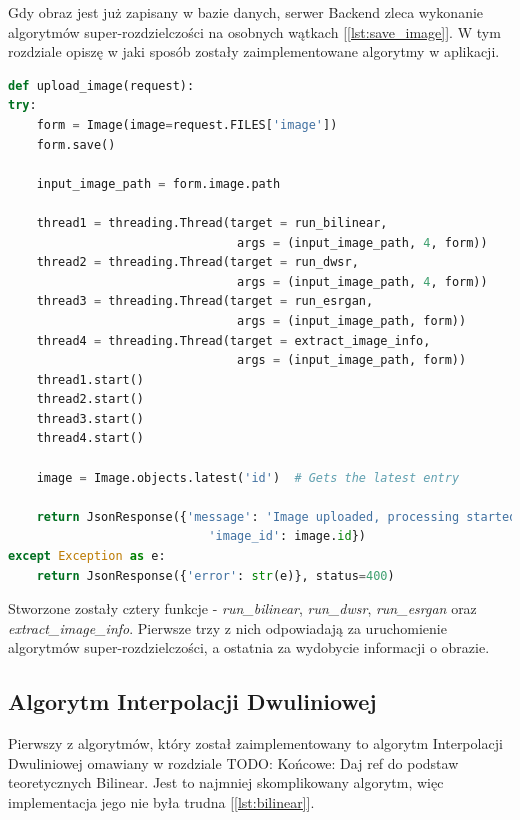 Gdy obraz jest już zapisany w bazie danych, serwer Backend zleca wykonanie algorytmów super-rozdzielczości na osobnych wątkach [\ref{lst:save_image}]. W tym rozdziale opiszę w jaki sposób zostały zaimplementowane algorytmy w aplikacji.

\begin{lstlisting}[language=Python, caption=Obsługa zapisu i przetwarzania obrazów., label={lst:save_image}]
def upload_image(request):
try:
    form = Image(image=request.FILES['image'])
    form.save()

    input_image_path = form.image.path
    
    thread1 = threading.Thread(target = run_bilinear, 
                                args = (input_image_path, 4, form))
    thread2 = threading.Thread(target = run_dwsr, 
                                args = (input_image_path, 4, form))
    thread3 = threading.Thread(target = run_esrgan, 
                                args = (input_image_path, form))
    thread4 = threading.Thread(target = extract_image_info, 
                                args = (input_image_path, form))
    thread1.start()
    thread2.start()
    thread3.start()
    thread4.start()

    image = Image.objects.latest('id')  # Gets the latest entry

    return JsonResponse({'message': 'Image uploaded, processing started', 
                            'image_id': image.id})
except Exception as e:
    return JsonResponse({'error': str(e)}, status=400)
\end{lstlisting}

Stworzone zostały cztery funkcje - \textit{run\_bilinear}, \textit{run\_dwsr}, \textit{run\_esrgan} oraz\\ \textit{extract\_image\_info}. Pierwsze trzy z nich odpowiadają za uruchomienie algorytmów super-rozdzielczości, a ostatnia za wydobycie informacji o obrazie.




\subsection*{Algorytm Interpolacji Dwuliniowej}

Pierwszy z algorytmów, który został zaimplementowany to algorytm Interpolacji Dwuliniowej omawiany w rozdziale
TODO: Końcowe: Daj ref do podstaw teoretycznych Bilinear.
Jest to najmniej skomplikowany algorytm, więc implementacja jego nie była trudna [\ref{lst:bilinear}].

